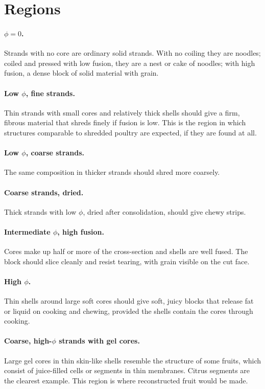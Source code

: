 \documentclass[11pt,openany]{book}
\theoremstyle{definition}
\begin{document}
\section{Regions}

\paragraph{$\phi = 0$.} Strands with no core are ordinary solid strands. With no coiling they are noodles; coiled and pressed with low fusion, they are a nest or cake of noodles; with high fusion, a dense block of solid material with grain.

\paragraph{Low $\phi$, fine strands.} Thin strands with small cores and relatively thick shells should give a firm, fibrous material that shreds finely if fusion is low. This is the region in which structures comparable to shredded poultry are expected, if they are found at all.

\paragraph{Low $\phi$, coarse strands.} The same composition in thicker strands should shred more coarsely.

\paragraph{Coarse strands, dried.} Thick strands with low $\phi$, dried after consolidation, should give chewy strips.

\paragraph{Intermediate $\phi$, high fusion.} Cores make up half or more of the cross-section and shells are well fused. The block should slice cleanly and resist tearing, with grain visible on the cut face.

\paragraph{High $\phi$.} Thin shells around large soft cores should give soft, juicy blocks that release fat or liquid on cooking and chewing, provided the shells contain the cores through cooking.

\paragraph{Coarse, high-$\phi$ strands with gel cores.} Large gel cores in thin skin-like shells resemble the structure of some fruits, which consist of juice-filled cells or segments in thin membranes. Citrus segments are the clearest example. This region is where reconstructed fruit would be made.
\end{document}
